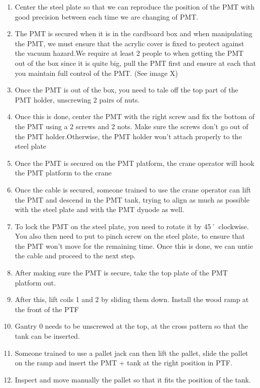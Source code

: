 \documentclass[twoside,letterpaper]{refart}
\begin{document}
\begin{enumerate}
    \item Center the steel plate so that we can reproduce the position of the PMT with good precision between each time we are changing of PMT. 
    \item The PMT is secured when it is in the cardboard box and when manipulating the PMT, we must ensure that the acrylic cover is fixed to protect against the vacuum hazard.We require at least 2 people to when getting the PMT out of the box since it is quite big, pull the PMT first and ensure at each that you maintain full control of the PMT. (See image X)
    \item Once the PMT is out of the box, you need to tale off the top part of the PMT holder, unscrewing 2 pairs of nuts. 
    \item Once this is done, center the PMT with the right screw and fix the bottom of the PMT using a 2 screws and 2 nots. Make sure the screws don't go out of the PMT holder.Otherwise, the PMT holder won't attach properly to the steel plate
    \item Once the PMT is secured on the PMT platform, the crane operator will hook the PMT platform to the crane
    \item Once the cable is secured, someone trained to use the crane operator can lift the PMT and descend in the PMT tank, trying to align as much as possible with the steel plate and with the PMT dynode as well.
    \item To lock the PMT on the steel plate, you need to rotate it by 45˚ clockwise. You also then need to put to pinch screw on the steel plate, to ensure that the PMT won't move for the remaining time. Once this is done, we can untie the cable and proceed to the next step.
    \item After making sure the PMT is secure, take the top plate of the PMT platform out.
    \item After this, lift coils 1 and 2 by sliding them down. Install the wood ramp at the front of the PTF
    \item Gantry 0 needs to be unscrewed at the top, at the cross pattern so that the tank can be inserted. 
    \item Someone trained to use a pallet jack can then lift the pallet, slide the pallet on the ramp and insert the PMT + tank at the right position in PTF. 
    \item Inspect and move manually the pallet so that it fits the position of the tank.

\end{enumerate}
\end{document}

